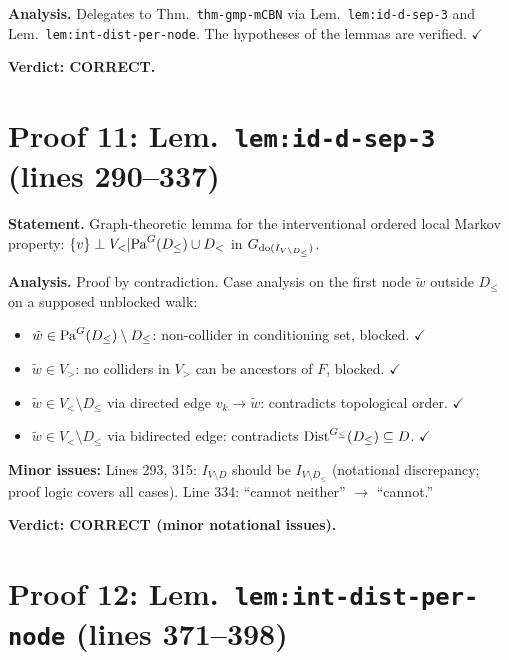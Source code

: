 \documentclass{article}
\begin{document}
\textbf{Analysis.}
Delegates to Thm.\ \texttt{thm-gmp-mCBN} via
Lem.\ \texttt{lem:id-d-sep-3} and Lem.\ \texttt{lem:int-dist-per-node}.
The hypotheses of the lemmas are verified.  $\checkmark$

\textbf{Verdict: CORRECT.}

\section{Proof 11: Lem.\ \texttt{lem:id-d-sep-3} (lines 290--337)}

\textbf{Statement.} Graph-theoretic lemma for the interventional ordered local
Markov property: $\{v\}\perp V_< | \mathrm{Pa}^G(D_\le)\cup D_<$ in
$G_{\operatorname{do}(I_{V\setminus D_\le})}$.

\textbf{Analysis.}
Proof by contradiction.  Case analysis on the first node $\tilde w$ outside
$D_\le$ on a supposed unblocked walk:
\begin{itemize}
  \item $\tilde w\in\mathrm{Pa}^G(D_\le)\setminus D_\le$: non-collider in
    conditioning set, blocked.  $\checkmark$
  \item $\tilde w\in V_>$: no colliders in $V_>$ can be ancestors of $F$,
    blocked.  $\checkmark$
  \item $\tilde w\in V_<\setminus D_\le$ via directed edge $v_k\to\tilde w$:
    contradicts topological order.  $\checkmark$
  \item $\tilde w\in V_<\setminus D_\le$ via bidirected edge: contradicts
    $\mathrm{Dist}^{G_\le}(D_\le)\subseteq D$.  $\checkmark$
\end{itemize}

\textbf{Minor issues:}
Lines 293, 315: $I_{V\setminus D}$ should be $I_{V\setminus D_\le}$
(notational discrepancy; proof logic covers all cases).
Line 334: ``cannot neither'' $\to$ ``cannot.''

\textbf{Verdict: CORRECT (minor notational issues).}

\section{Proof 12: Lem.\ \texttt{lem:int-dist-per-node} (lines 371--398)}
\end{document}
